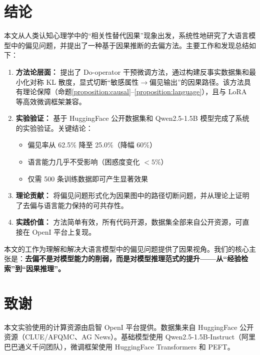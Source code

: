 \documentclass[12pt,a4paper,oneside]{ctexart}
\begin{document}
\section{结论}

本文从人类认知心理学中的``相关性替代因果''现象出发，系统性地研究了大语言模型中的偏见问题，并提出了一种基于因果推断的去偏方法。主要工作和发现总结如下：

\begin{enumerate}
  \item \textbf{方法论层面：} 提出了 Do-operator 干预微调方法，通过构建反事实数据集和最小化对称 KL 散度，显式切断``敏感属性$\to$偏见输出''的因果路径。该方法具有理论保障（命题\ref{proposition:causal}--\ref{proposition:language}），且与 LoRA 等高效微调框架兼容。

  \item \textbf{实验验证：} 基于 HuggingFace 公开数据集和 Qwen2.5-1.5B 模型完成了系统的实验验证。关键结论：
  \begin{itemize}
    \item 偏见率从 62.5\% 降至 25.0\%（降幅 60\%）
    \item 语言能力几乎不受影响（困惑度变化 $< 5\%$）
    \item 仅需 500 条训练数据即可产生显著效果
  \end{itemize}

  \item \textbf{理论贡献：} 将偏见问题形式化为因果图中的路径切断问题，并从理论上证明了去偏与语言能力保持的可共存性。

  \item \textbf{实践价值：} 方法简单有效，所有代码开源，数据集全部来自公开资源，可直接在 OpenI 平台上复现。
\end{enumerate}

本文的工作为理解和解决大语言模型中的偏见问题提供了因果视角。我们的核心主张是：\textbf{去偏不是对模型能力的削弱，而是对模型推理范式的提升——从``经验检索''到``因果推理''。}

\section*{致谢}

本文实验使用的计算资源由启智 OpenI 平台提供。数据集来自 HuggingFace 公开资源（CLUE/AFQMC、AG News）。基础模型使用 Qwen2.5-1.5B-Instruct（阿里巴巴通义千问团队），微调框架使用 HuggingFace Transformers 和 PEFT。
\end{document}
